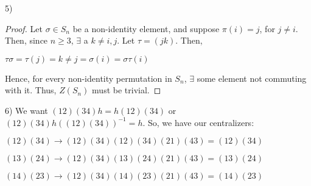 \documentclass[executivepaper]{article}
\begin{document}
\begin{flushleft}

5)

\begin{center}

\begin{proof}

Let $\sigma \in S_{n}$ be a non-identity element, and suppose $\pi(i)=j$, for $j \neq i$. Then, since $n \geq 3$, $\exists$ a $k \neq i, j$. Let $\tau=(jk)$. Then, 

\begin{center}

$\tau \sigma=\tau(j)=k \neq j=\sigma(i)=\sigma \tau(i)$

\end{center}

Hence, for every non-identity permutation in $S_{n}$, $\exists$ some element not commuting with it. Thus, $Z(S_{n})$ must be trivial.

\end{proof}

\end{center}

\end{flushleft}

\begin{flushleft}

6) We want $(12)(34)h=h(12)(34)$ or $(12)(34)h((12)(34))^{-1}=h$. So, we have our centralizers:

\begin{center}

$(12)(34) \rightarrow (12)(34)(12)(34)(21)(43)=(12)(34)$

\vspace{1mm}

$(13)(24) \rightarrow (12)(34)(13)(24)(21)(43)=(13)(24)$

\vspace{1mm}

$(14)(23) \rightarrow (12)(34)(14)(23)(21)(43)=(14)(23)$

\end{center}

\end{flushleft}
\end{document}
